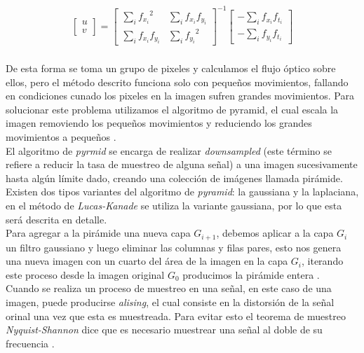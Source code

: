 \documentclass{iccmemoria}
\begin{document}
\begin{equation}
	\begin{split}
		\begin{bmatrix} u \\ v \end{bmatrix} = \begin{bmatrix} \sum_{i}{f_{x_i}}^2 & \sum_{i}{f_{x_i} f_{y_i} } \\ \sum_{i}{f_{x_i} f_{y_i}} & \sum_{i}{f_{y_i}}^2 \end{bmatrix}^{-1} \begin{bmatrix} - \sum_{i}{f_{x_i} f_{t_i}} \\ - \sum_{i}{f_{y_i} f_{t_i}} \end{bmatrix}
	\end{split}
\end{equation}\\

De esta forma se toma un grupo de pixeles y calculamos el flujo óptico sobre ellos, pero el método descrito funciona solo con pequeños movimientos, fallando en condiciones cunado los pixeles en la imagen sufren grandes movimientos. Para solucionar este problema utilizamos el algoritmo de pyramid, el cual escala la imagen removiendo los pequeños movimientos y reduciendo los grandes movimientos a pequeños \cite{OpenCV}.\\

El algoritmo de \emph{pyrmid} se encarga de realizar \emph{downsampled} (este término se refiere a reducir la tasa de muestreo de alguna señal) a una imagen sucesivamente hasta algún límite dado, creando una colección de imágenes llamada pirámide. Existen dos tipos variantes del algoritmo de \emph{pyramid}: la gaussiana y la laplaciana, en el método de \emph{Lucas-Kanade} se utiliza la variante gaussiana, por lo que esta será descrita en detalle.\\

Para agregar a la pirámide una nueva capa $G_{i+1}$, debemos aplicar a la capa $G_i$ un filtro gaussiano y luego eliminar las columnas y filas pares, esto nos genera una nueva imagen con un cuarto del área de la imagen en la capa $G_i$, iterando este proceso desde la imagen original $G_0$ producimos la pirámide entera \cite{bradski2008learning}.\\

Cuando se realiza un proceso de muestreo en una señal, en este caso de una imagen, puede producirse \emph{alising}, el cual consiste en la distorsión de la señal orinal una vez que esta es muestreada. Para evitar esto el teorema de muestreo \emph{Nyquist-Shannon} dice que es necesario muestrear una señal al doble de su frecuencia \cite{ImagePyramid}.\\
\end{document}
